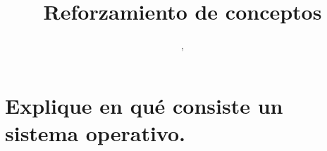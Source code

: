 \documentclass{article}
\author{\nombre , \carnet}
\title{\textbf{\Huge\titulo}\\Reforzamiento de conceptos}
\begin{document}
\maketitle
\section{Explique en qué consiste un sistema operativo.}
\end{document}
